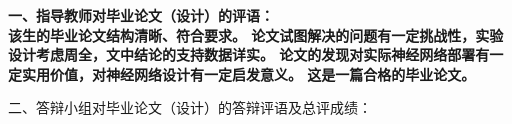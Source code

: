 \cleardoublepage{}

{
    \bfseries
    \noindent 一、指导教师对毕业论文（设计）的评语：\\
    
    该生的毕业论文结构清晰、符合要求。
    论文试图解决的问题有一定挑战性，实验设计考虑周全，文中结论的支持数据详实。
    论文的发现对实际神经网络部署有一定实用价值，对神经网络设计有一定启发意义。
    这是一篇合格的毕业论文。

    \signature{指导教师（签名）}

    \noindent 二、答辩小组对毕业论文（设计）的答辩评语及总评成绩：\\

    \mbox{} \vfill

    \finaleval[9][13][4][62][88]

    \signature{负责人（签名）}
}

